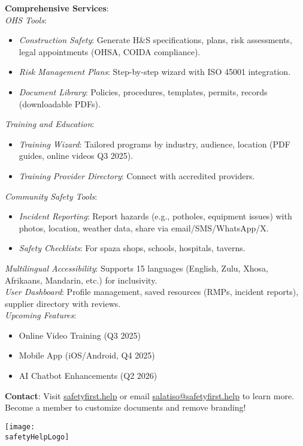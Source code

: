 \documentclass[11pt]{article}
\newcommand{\safetyHelpLogo}{/safety-plans/assets/images/logo.png}
\begin{document}
{  \textbf{Comprehensive Services}: \\
  \textit{OHS Tools}: \\
  \begin{itemize}
    \item \textit{Construction Safety}: Generate H\&S specifications, plans, risk assessments, legal appointments (OHSA, COIDA compliance).
    \item \textit{Risk Management Plans}: Step-by-step wizard with ISO 45001 integration.
    \item \textit{Document Library}: Policies, procedures, templates, permits, records (downloadable PDFs).
  \end{itemize}
  \textit{Training and Education}: \\
  \begin{itemize}
    \item \textit{Training Wizard}: Tailored programs by industry, audience, location (PDF guides, online videos Q3 2025).
    \item \textit{Training Provider Directory}: Connect with accredited providers.
  \end{itemize}
  \textit{Community Safety Tools}: \\
  \begin{itemize}
    \item \textit{Incident Reporting}: Report hazards (e.g., potholes, equipment issues) with photos, location, weather data, share via email/SMS/WhatsApp/X.
    \item \textit{Safety Checklists}: For spaza shops, schools, hospitals, taverns.
  \end{itemize}
  \textit{Multilingual Accessibility}: Supports 15 languages (English, Zulu, Xhosa, Afrikaans, Mandarin, etc.) for inclusivity. \\
  \textit{User Dashboard}: Profile management, saved resources (RMPs, incident reports), supplier directory with reviews. \\
  \textit{Upcoming Features}: \\
  \begin{itemize}
    \item Online Video Training (Q3 2025)
    \item Mobile App (iOS/Android, Q4 2025)
    \item AI Chatbot Enhancements (Q2 2026)
  \end{itemize}

  \textbf{Contact}: Visit \href{https://safetyfirst.help}{safetyfirst.help} or email \href{mailto:salatiso@safetyfirst.help}{salatiso@safetyfirst.help} to learn more. Become a member to customize documents and remove branding!

  \vspace{2cm}
  \hfill \texttt{[image: \\safetyHelpLogo]}
}{}

\label{LastPage}
\end{document}

